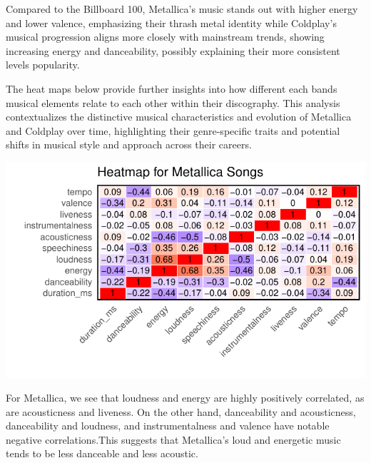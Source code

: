 \documentclass[11pt,preprint, authoryear]{elsarticle}
\let\origfigure\figure
\let\endorigfigure\endfigure
\renewenvironment{figure}[1][2] {
    \expandafter\origfigure\expandafter[H]
} {
    \endorigfigure
}
\numberwithin{equation}{section}
\numberwithin{figure}{section}
\numberwithin{table}{section}
\begin{document}
Compared to the Billboard 100, Metallica's music stands out with higher
energy and lower valence, emphasizing their thrash metal identity while
Coldplay's musical progression aligns more closely with mainstream
trends, showing increasing energy and danceability, possibly explaining
their more consistent levels popularity.

The heat maps below provide further insights into how different each
bands musical elements relate to each other within their discography.
This analysis contextualizes the distinctive musical characteristics and
evolution of Metallica and Coldplay over time, highlighting their
genre-specific traits and potential shifts in musical style and approach
across their careers.

\begin{figure}[H]

{\centering \includegraphics{Question2_files/figure-latex/Figure4-1} 

}

\caption{Heatmap of Metallicas musical attributes\label{Figure4}}\label{fig:Figure4}
\end{figure}

For Metallica, we see that loudness and energy are highly positively
correlated, as are acousticness and liveness. On the other hand,
danceability and acousticness, danceability and loudness, and
instrumentalness and valence have notable negative correlations.This
suggests that Metallica's loud and energetic music tends to be less
danceable and less acoustic.
\end{document}

